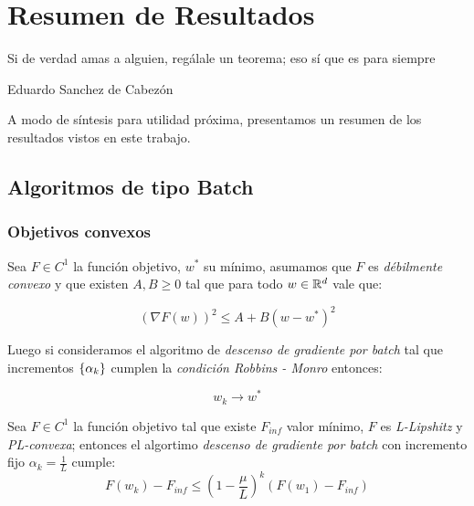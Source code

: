 \chapter{Resumen de Resultados}\label{ch:resumen}

\epigraph{Si de verdad amas a alguien, reg\'alale un teorema; eso s\'i que es para siempre}{Eduardo Sanchez de Cabez\'on}

A modo de s\'intesis para utilidad pr\'oxima, presentamos un resumen de los resultados vistos en este trabajo.

\section{Algoritmos de tipo Batch}

\subsection{Objetivos convexos}

\begin{theorem}
	Sea $F \in C^1$ la funci\'on objetivo, $w^*$ su m\'inimo, asumamos que $F$ es \textit{d\'ebilmente convexo} y que existen $A,B \geq 0$ tal que para todo $w \in {\mathbb{R}}^d$ vale que:
	
	\begin{equation*}
	\left(\nabla F(w)\right)^2 \leq A + B \left(w - w^*\right)^2
	\end{equation*}
	
	Luego si consideramos el algoritmo de \textit{descenso de gradiente por batch} tal que incrementos $\left\lbrace\alpha_k\right\rbrace$  cumplen la \textit{condici\'on Robbins - Monro} entonces:
	
	\begin{equation*}
	w_k \rightarrow w^*
	\end{equation*}
	
\end{theorem}

\begin{theorem}
	Sea $F \in C^1$ la funci\'on objetivo tal que existe $F_{inf}$ valor m\'inimo, $F$ es \textit{L-Lipshitz} y \textit{PL-convexa}; entonces el algortimo \textit{descenso de gradiente por batch} con incremento fijo $\alpha_k = \frac{1}{L}$ cumple:
	\begin{equation*}
	F(w_k) - F_{inf} \leq \left(1 - \frac{\mu}{L}\right)^k \left(F(w_1) - F_{inf}\right)
	\end{equation*}
\end{theorem}

